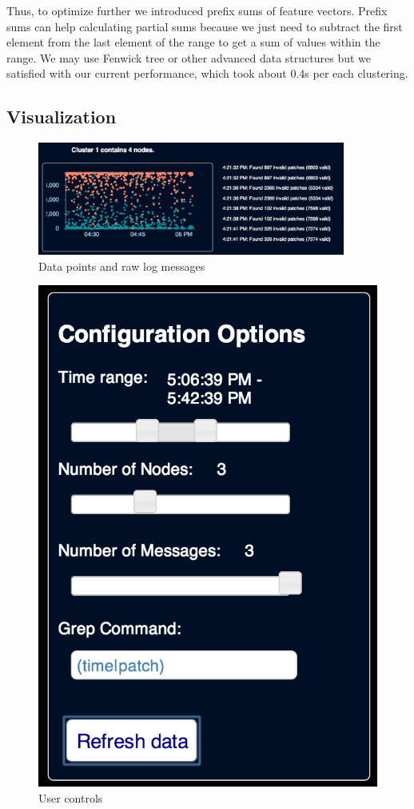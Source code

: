 \documentclass[conference]{acmsiggraph}
\begin{document}
Thus, to optimize further we introduced prefix sums of feature vectors. Prefix sums can help
calculating partial sums because we just need to subtract the first element from the last element of
the range to get a sum of values within the range.  We may use Fenwick tree \cite{Fenwick94} or
other advanced data structures but we satisfied with our current performance, which took about 0.4s
per each clustering.

\subsection{Visualization}
\begin{figure}[p]
    \centering
    \includegraphics[width=0.9\textwidth]{images/screenshot_plot.png}
    \caption{Data points and raw log messages}
    \label{fig:ss_plot}
\end{figure}

\begin{figure}[p]
    \centering
    \includegraphics[width=0.7\columnwidth]{images/screenshot_controls.png}
    \caption{User controls}
    \label{fig:ss_controls}
\end{figure}
\end{document}

